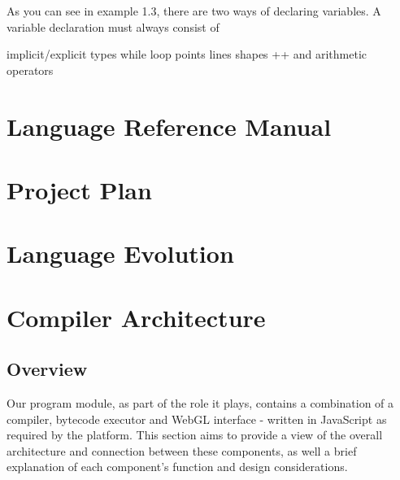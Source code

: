\documentclass{l3proj}
\begin{document}
As you can see in example 1.3, there are two ways of declaring variables. A variable declaration must always consist of 

implicit/explicit types
while loop
points
lines
shapes
++ and arithmetic operators



\chapter{Language Reference Manual}
\label{manual}

\chapter{Project Plan}
\label{plan}

\chapter{Language Evolution}
\label{evo}

\chapter{Compiler Architecture}
\label{arch}

\section{Overview}
\label{arch-over}

Our program module, as part of the role it plays, contains a combination of a compiler, bytecode executor and WebGL interface - written in JavaScript as required by the platform. This section aims to provide a view of the overall architecture and connection between these components, as well a brief explanation of each component's function and design considerations.
\end{document}
